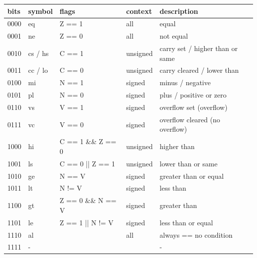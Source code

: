 \documentclass
[
    10pt,
    a4paper,
]
{article}
\begin{document}
{\normalsize
\begin{tabular}
    { | p{} | p{} | p{} | p{} | p{} | }
    \hline
    \textbf{bits} & \textbf{symbol} & \textbf{flags} &
    \textbf{context} & \textbf{description}\\
    \hline
    \hline
    0000 & eq       & Z == 1                & all       &
    equal\\
    \hline
    0001 & ne       & Z == 0                & all       &
    not equal\\
    \hline
    0010 & cs / hs  & C == 1                & unsigned  &
    carry set / higher than or same\\
    \hline
    0011 & cc / lo  & C == 0                & unsigned  &
    carry cleared / lower than\\
    \hline
    0100 & mi       & N == 1                & signed    &
    minus / negative\\
    \hline
    0101 & pl       & N == 0                & signed    &
    plus / positive or zero\\
    \hline
    0110 & vs       & V == 1                & signed    &
    overflow set (overflow)\\
    \hline
    0111 & vc       & V == 0                & signed    &
    overflow cleared (no overflow)\\
    \hline
    1000 & hi       & C == 1 \&\& Z == 0    & unsigned  &
    higher than\\
    \hline
    1001 & ls       & C == 0 ||   Z == 1    & unsigned  &
    lower than or same\\
    \hline
    1010 & ge       & N == V                & signed    &
    greater than or equal\\
    \hline
    1011 & lt       & N != V                & signed    &
    less than\\
    \hline
    1100 & gt       & Z == 0 \&\& N == V    & signed    &
    greater than\\
    \hline
    1101 & le       & Z == 1 ||   N != V    & signed    &
    less than or equal\\
    \hline
    1110 & al       &                       & all       &
    always == no condition\\
    \hline
    1111 & -        &                       &           &
    -\\
    \hline
\end{tabular}
}
\end{document}
